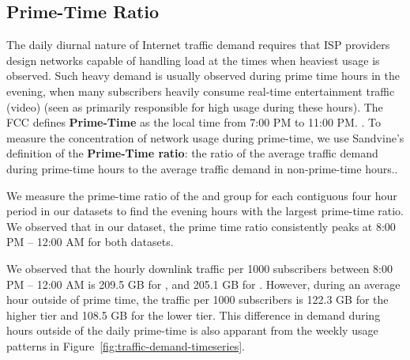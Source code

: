 \subsection{Prime-Time Ratio} \label{subsec:primetime}

The daily diurnal nature of Internet traffic demand requires that ISP providers 
design networks capable of handling load at the times when heaviest usage is 
observed. Such heavy demand is usually observed during prime time hours in the 
evening, when many subscribers heavily consume real-time entertainment traffic
(video) (seen as primarily responsible for high usage during these hours). The FCC defines 
\textbf{Prime-Time} as the local time from 7:00 PM to 11:00 PM.
\cite{fcc2014measuring-broadband}. To measure the concentration of network usage
during prime-time, we use Sandvine's definition of the \textbf{Prime-Time 
ratio}: the ratio of the average traffic demand during prime-time hours to the average 
traffic demand in non-prime-time hours.\cite{sandvine20141h, sandvine20142h}.

We measure the prime-time ratio of the \control{} and \treatment{} group
for each contiguous four hour period in our datasets to find the evening hours with
the largest prime-time ratio. We observed that in our dataset,
the prime time ratio consistently peaks at 8:00 PM -- 12:00 AM for both
datasets.





We observed that the hourly downlink traffic per 1000 subscribers between 8:00 PM -- 12:00 AM is 
209.5 GB for \treatment{}, and 205.1 GB for \control{}. However, during an average hour
outside of prime time, the traffic per 1000 subscribers is 122.3 GB for the higher tier
and 108.5 GB for the lower tier. This difference in demand during hours outside of the
daily prime-time is also apparant from the weekly usage patterns in Figure~\ref{fig:traffic-demand-timeseries}.

